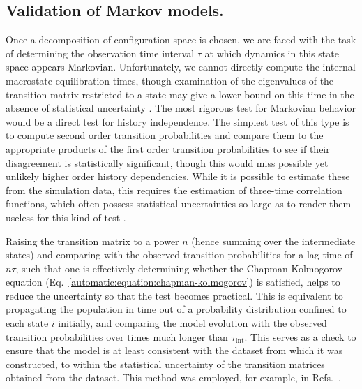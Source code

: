 \subsection{Validation of Markov models.}
\label{automatic:section:theory:validation}

Once a decomposition of configuration space is chosen, we are faced with the task of determining the observation time interval $\tau$ at which dynamics in this state space appears Markovian.
Unfortunately, we cannot directly compute the internal macrostate equilibration times, though examination of the eigenvalues of the transition matrix restricted to a state may give a lower bound on this time in the absence of statistical uncertainty \cite{meerbach:2004a}.
The most rigorous test for Markovian behavior would be a direct test for history independence.
The simplest test of this type is to compute second order transition probabilities and compare them to the appropriate products of the first order transition probabilities to see if their disagreement is statistically significant, though this would miss possible yet unlikely higher order history dependencies.
While it is possible to estimate these from the simulation data, this requires the estimation of three-time correlation functions, which often possess statistical uncertainties so large as to render them useless for this kind of test \cite{chodera:jpcb:2006}.

Raising the transition matrix to a power $n$ (hence summing over the intermediate states) and comparing with the observed transition probabilities for a lag time of $n\tau$, such that one is effectively determining whether the Chapman-Kolmogorov equation (Eq.\ \ref{automatic:equation:chapman-kolmogorov}) is satisfied, helps to reduce the uncertainty so that the test becomes practical.
This is equivalent to propagating the population in time out of a probability distribution confined to each state $i$ initially, and comparing the model evolution with the observed transition probabilities over times much longer than $\tau_{\mathrm{int}}$.
This serves as a check to ensure that the model is at least consistent with the dataset from which it was constructed, to within the statistical uncertainty of the transition matrices obtained from the dataset.
This method was employed, for example, in Refs.\ \cite{swope:2004a,chodera:mms:2006}.

